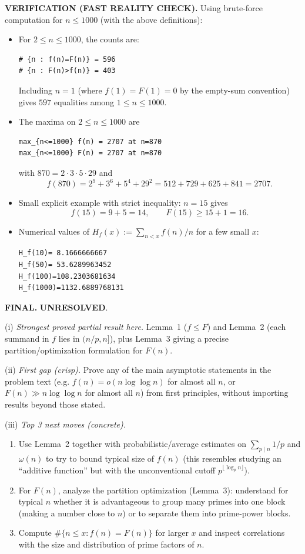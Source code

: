 \medskip
\noindent\textbf{VERIFICATION (FAST REALITY CHECK).}
Using brute-force computation for $n\le 1000$ (with the above definitions):
\begin{itemize}
\item For $2\le n\le 1000$, the counts are:
\begin{verbatim}
# {n : f(n)=F(n)} = 596
# {n : F(n)>f(n)} = 403
\end{verbatim}
Including $n=1$ (where $f(1)=F(1)=0$ by the empty-sum convention) gives $597$ equalities among $1\le n\le 1000$.
\item The maxima on $2\le n\le 1000$ are
\begin{verbatim}
max_{n<=1000} f(n) = 2707 at n=870
max_{n<=1000} F(n) = 2707 at n=870
\end{verbatim}
with $870=2\cdot 3\cdot 5\cdot 29$ and
\[
 f(870)=2^9+3^6+5^4+29^2=512+729+625+841=2707.
\]
\item Small explicit example with strict inequality: $n=15$ gives
\[
 f(15)=9+5=14,\qquad F(15)\ge 15+1=16.
\]
\item Numerical values of $H_f(x):=\sum_{n<x} f(n)/n$ for a few small $x$:
\begin{verbatim}
H_f(10)= 8.1666666667
H_f(50)= 53.6289963452
H_f(100)=108.2303681634
H_f(1000)=1132.6889768131
\end{verbatim}
\end{itemize}

\medskip
\noindent\textbf{FINAL.} \textbf{UNRESOLVED}.

\noindent(i) \emph{Strongest proved partial result here.}
Lemma~1 ($f\le F$) and Lemma~2 (each summand in $f$ lies in $(n/p,n]$), plus Lemma~3 giving a precise partition/optimization formulation for $F(n)$.

\noindent(ii) \emph{First gap (crisp).}
Prove any of the main asymptotic statements in the problem text (e.g. $f(n)=o(n\log\log n)$ for almost all $n$, or $F(n)\gg n\log\log n$ for almost all $n$) from first principles, without importing results beyond those stated.

\noindent(iii) \emph{Top 3 next moves (concrete).}
\begin{enumerate}
\item Use Lemma~2 together with probabilistic/average estimates on $\sum_{p\mid n} 1/p$ and $\omega(n)$ to try to bound typical size of $f(n)$ (this resembles studying an ``additive function'' but with the unconventional cutoff $p^{\lfloor\log_p n\rfloor}$).
\item For $F(n)$, analyze the partition optimization (Lemma~3): understand for typical $n$ whether it is advantageous to group many primes into one block (making a number close to $n$) or to separate them into prime-power blocks.
\item Compute $\#\{n\le x: f(n)=F(n)\}$ for larger $x$ and inspect correlations with the size and distribution of prime factors of $n$.
\end{enumerate}

